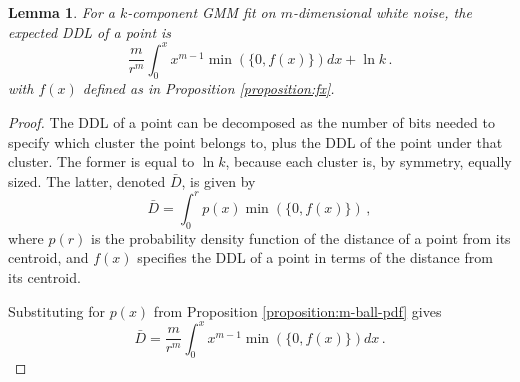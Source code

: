 \documentclass[a4paper,fleqn]{cas-sc}
\newtheorem{lemma}[theorem]{Lemma}
\theoremstyle{remark}
\begin{document}
\begin{lemma} \label{lemma:form-of-EDDL}
For a $k$-component GMM fit on $m$-dimensional white noise, the expected DDL of a point is 
\[
\frac{m}{r^m}\int_0^x x^{m-1} \min(\{0,f(x)\}) dx + \ln{k} \,.
\]
with $f(x)$ defined as in Proposition \ref{proposition:fx}.
\end{lemma}
\begin{proof}
The DDL of a point can be decomposed as the number of bits needed to specify which cluster the point belongs to, plus the DDL of the point under that cluster. The former is equal to $\ln{k}$, because each cluster is, by symmetry, equally sized. The latter, denoted $\bar{D}$, is given by
\[
\bar{D} = \int_0^r p(x) \min(\{0,f(x)\}) \,,
\]
where $p(r)$ is the probability density function of the distance of a point from its centroid, and $f(x)$ specifies the DDL of a point in terms of the distance from its centroid. 

Substituting for $p(x)$ from Proposition \ref{proposition:m-ball-pdf} gives 
\[
\bar{D} = \frac{m}{r^m}\int_0^x x^{m-1} \min(\{0,f(x)\}) dx \,.
\]
\end{proof}
\end{document}
